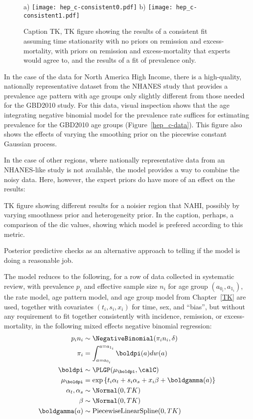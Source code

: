 \begin{figure}
\begin{center}
a)
\texttt{[image: hep\_c-consistent0.pdf]}
b)
\texttt{[image: hep\_c-consistent1.pdf]}
\end{center}
\caption{Caption TK, TK figure showing the results of a consistent fit
  assuming time stationarity with no priors on remission and
  excess-mortality, with priors on remission and excess-mortality that
  experts would agree to, and the results of a fit of prevalence only.
}
\label{hep_c-consistent}
\end{figure}

In the case of the data for North America High Income, there is a
high-quality, nationally representative dataset from the NHANES study
that provides a prevalence age pattern with age groups only slightly
different from those needed for the GBD2010 study.  For this data,
visual inspection shows that the age integrating negative binomial
model for the prevalence rate suffices for estimating prevalence for
the GBD2010 age groups (Figure~\ref{hep_c-data}).  
This figure also shows the effects of varying the smoothing prior on
the piecewise constant Gaussian process.

In the case of other regions, where nationally representative data
from an NHANES-like study is not available, the model provides a way
to combine the noisy data.  Here, however, the expert priors do have
more of an effect on the results:

TK figure showing different results for a noisier region that NAHI,
possibly by varying smoothness prior and heterogeneity prior.  In the
caption, perhaps, a comparison of the dic values, showing which model
is prefered according to this metric.

Posterior predictive checks as an alternative approach to telling if
the model is doing a reasonable job.

The model reduces to the following, for a row of data collected in
systematic review, with prevalence $p_i$ and effective sample size $n_i$ for
age group $(a_{0_i}, a_{1_i})$, the rate model, age pattern model,
and age group model from Chapter~\ref{TK} are used, together with
covariates $(t_i,s_i,x_i)$ for time, sex, and ``bias'', but without any requirement to
fit together consistently with incidence, remission, or
excess-mortality, in the following mixed effects negative binomial
regression:
\begin{align*}
p_i n_i &\sim \NegativeBinomial(\pi_i n_i, \delta)\\
\pi_i &= \int _{a=a_{0_i}} ^{a=a_{1_i}} \boldpi(a) dw(a)\\
\boldpi &\sim \PLGP(\mu_\boldpi, \calC)\\
\mu_\boldpi &= \exp\left\{ t_i \alpha_t + s_i \alpha_s + x_i \beta + \boldgamma(a) \right\}\\
\alpha_t, \alpha_s &\sim \Normal(0, TK)\\
\beta &\sim \Normal(0, TK)\\
\boldgamma(a) &\sim \text{PiecewiseLinearSpline}(0, TK)
\end{align*}

